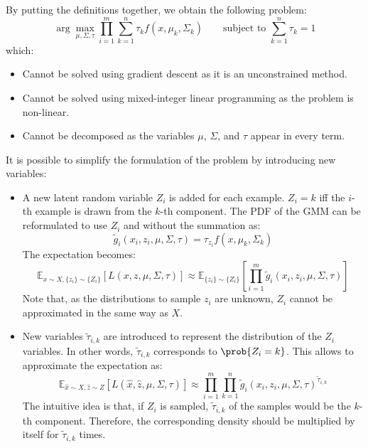 \begin{description}
\begin{description}
                By putting the definitions together, we obtain the following problem:
                \[ \arg\max_{\mu, \Sigma, \tau} \prod_{i=1}^{m} \sum_{k=1}^{n} \tau_k f(x, \mu_k, \Sigma_k) \qquad \text{subject to } \sum_{k=1}^{n} \tau_k = 1 \]
                which:
                \begin{itemize}
                    \item Cannot be solved using gradient descent as it is an unconstrained method.
                    \item Cannot be solved using mixed-integer linear programming as the problem is non-linear.
                    \item Cannot be decomposed as the variables $\mu$, $\Sigma$, and $\tau$ appear in every term.
                \end{itemize}

                It is possible to simplify the formulation of the problem by introducing new variables:
                \begin{itemize}
                    \item A new latent random variable $Z_i$ is added for each example. $Z_i = k$ iff the $i$-th example is drawn from the $k$-th component. The PDF of the GMM can be reformulated to use $Z_i$ and without the summation as:
                    \[ \tilde{g}_i(x_i, z_i, \mu, \Sigma, \tau) = \tau_{z_i} f(x, \mu_k, \Sigma_k) \]
                    The expectation becomes:
                    \[ \mathbb{E}_{x \sim X, \{z_i\} \sim \{Z_i\}} \left[ L(x, z, \mu, \Sigma, \tau) \right] \approx \mathbb{E}_{\{z_i\} \sim \{Z_i\}} \left[ \prod_{i=1}^{m} \tilde{g}_i(x_i, z_i, \mu, \Sigma, \tau) \right] \]
                    Note that, as the distributions to sample $z_i$ are unknown, $Z_i$ cannot be approximated in the same way as $X$.

                    \item New variables $\tilde{\tau}_{i, k}$ are introduced to represent the distribution of the $Z_i$ variables. In other words, $\tilde{\tau}_{i, k}$ corresponds to $\prob{Z_i = k}$. This allows to approximate the expectation as:
                    \[ \mathbb{E}_{\hat{x} \sim X, \hat{z} \sim Z} \left[ L(\hat{x}, \hat{z}, \mu, \Sigma, \tau) \right] \approx \prod_{i=1}^{m} \prod_{k=1}^{n} \tilde{g}_i(x_i, z_i, \mu, \Sigma, \tau)^{\tilde{\tau}_{i, k}} \]
                    The intuitive idea is that, if $Z_i$ is sampled, $\tilde{\tau}_{i, k}$ of the samples would be the $k$-th component. Therefore, the corresponding density should be multiplied by itself for $\tilde{\tau}_{i, k}$ times.
                \end{itemize}


\end{description}
\end{description}
